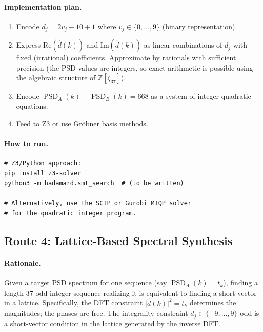 \documentclass[11pt,a4paper]{article}
\newcommand{\Z}{\mathbb{Z}}
\newcommand{\abs}[1]{\lvert #1 \rvert}
\newcommand{\PSD}{\operatorname{PSD}}
\theoremstyle{plain}
\theoremstyle{definition}
\theoremstyle{remark}
\begin{document}
\paragraph{Implementation plan.}
\begin{enumerate}
\item Encode $d_j=2v_j-10+1$ where $v_j\in\{0,\dots,9\}$ (binary representation).
\item Express $\text{Re}(\widehat{d}(k))$ and $\text{Im}(\widehat{d}(k))$ as linear combinations of $d_j$ with fixed (irrational) coefficients. Approximate by rationals with sufficient precision (the PSD values are integers, so exact arithmetic is possible using the algebraic structure of $\Z[\zeta_{37}]$).
\item Encode $\PSD_A(k)+\PSD_B(k)=668$ as a system of integer quadratic equations.
\item Feed to Z3 or use Gr\"obner basis methods.
\end{enumerate}

\paragraph{How to run.}
\begin{lstlisting}
# Z3/Python approach:
pip install z3-solver
python3 -m hadamard.smt_search  # (to be written)

# Alternatively, use the SCIP or Gurobi MIQP solver
# for the quadratic integer program.
\end{lstlisting}

\subsection{Route 4: Lattice-Based Spectral Synthesis}
\label{sec:route4}

\paragraph{Rationale.} Given a target PSD spectrum for one sequence (say $\PSD_A(k)=t_k$), finding a length-$37$ odd-integer sequence realizing it is equivalent to finding a short vector in a lattice. Specifically, the DFT constraint $\abs{\widehat{d}(k)}^2=t_k$ determines the magnitudes; the phases are free. The integrality constraint $d_j\in\{-9,\dots,9\}$ odd is a short-vector condition in the lattice generated by the inverse DFT.
\end{document}
